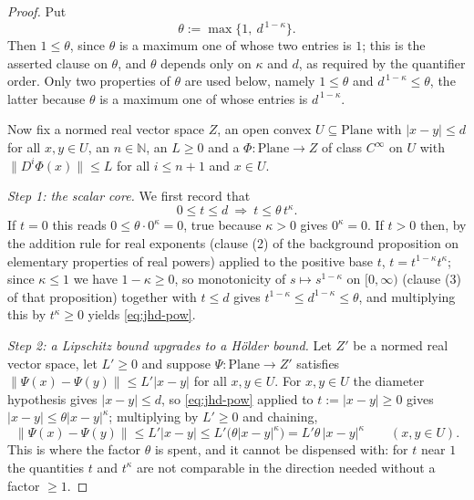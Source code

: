 \begin{proof}
Put
\[
  \theta:=\max\bigl\{1,\ d^{\,1-\kappa}\bigr\} .
\]
Then $1\le\theta$, since $\theta$ is a maximum one of whose two entries is $1$; this is the
asserted clause on $\theta$, and $\theta$ depends only on $\kappa$ and $d$, as required by the
quantifier order.  Only two properties of $\theta$ are used below, namely $1\le\theta$ and
$d^{\,1-\kappa}\le\theta$, the latter because $\theta$ is a maximum one of whose entries is
$d^{\,1-\kappa}$.

Now fix a normed real vector space $Z$, an open convex $U\subseteq\mathrm{Plane}$ with
$\lvert x-y\rvert\le d$ for all $x,y\in U$, an $n\in\mathbb{N}$, an $L\ge0$ and a
$\Phi\colon\mathrm{Plane}\to Z$ of class $C^{\infty}$ on $U$ with
$\lVert D^{i}\Phi(x)\rVert\le L$ for all $i\le n+1$ and $x\in U$.

\medskip\noindent\emph{Step 1: the scalar core.}
We first record that
\begin{equation}\label{eq:jhd-pow}
  0\le t\le d\ \Longrightarrow\ t\le\theta\,t^{\kappa}.
\end{equation}
If $t=0$ this reads $0\le\theta\cdot0^{\kappa}=0$, true because $\kappa>0$ gives $0^{\kappa}=0$.
If $t>0$ then, by the addition rule for real exponents (clause (2) of the background proposition
on elementary properties of real powers) applied to the positive base $t$,
$t=t^{1-\kappa}t^{\kappa}$; since $\kappa\le1$ we have $1-\kappa\ge0$, so monotonicity of
$s\mapsto s^{1-\kappa}$ on $[0,\infty)$ (clause (3) of that proposition) together with $t\le d$
gives $t^{1-\kappa}\le d^{1-\kappa}\le\theta$, and multiplying this by $t^{\kappa}\ge0$ yields
\eqref{eq:jhd-pow}.

\medskip\noindent\emph{Step 2: a Lipschitz bound upgrades to a H\"older bound.}
Let $Z'$ be a normed real vector space, let $L'\ge0$ and suppose
$\Psi\colon\mathrm{Plane}\to Z'$ satisfies $\lVert\Psi(x)-\Psi(y)\rVert\le L'\lvert x-y\rvert$
for all $x,y\in U$.  For $x,y\in U$ the diameter hypothesis gives $\lvert x-y\rvert\le d$, so
\eqref{eq:jhd-pow} applied to $t:=\lvert x-y\rvert\ge0$ gives
$\lvert x-y\rvert\le\theta\lvert x-y\rvert^{\kappa}$; multiplying by $L'\ge0$ and chaining,
\begin{equation}\label{eq:jhd-lip}
  \bigl\lVert\Psi(x)-\Psi(y)\bigr\rVert\le L'\lvert x-y\rvert
    \le L'\bigl(\theta\lvert x-y\rvert^{\kappa}\bigr)
    =L'\theta\,\lvert x-y\rvert^{\kappa}
  \qquad(x,y\in U).
\end{equation}
This is where the factor $\theta$ is spent, and it cannot be dispensed with: for $t$ near $1$ the
quantities $t$ and $t^{\kappa}$ are not comparable in the direction needed without a factor
$\ge1$.


\end{proof}
